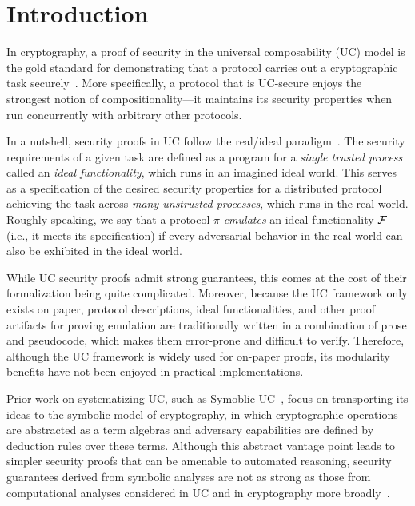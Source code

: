 \section{Introduction}
\label{sec:introduction}

In cryptography, a proof of security in the universal composability (UC) model
is the gold standard for demonstrating that a protocol carries out a
cryptographic task securely~\cite{canetti2001universally}. More specifically, a
protocol that is UC-secure enjoys the strongest notion of compositionality---it
maintains its security properties when run concurrently with arbitrary other
protocols.

In a nutshell, security proofs in UC follow the real/ideal
paradigm~\cite{goldreich1987play}. The security requirements of a given task are
defined as a program for a \emph{single trusted process} called an \emph{ideal
  functionality}, which runs in an imagined ideal world. This serves as a
specification of the desired security properties for a distributed protocol
achieving the task across \emph{many unstrusted processes}, which runs in the
real world. Roughly speaking, we say that a protocol $\pi$ \emph{emulates} an
ideal functionality $\mathcal{{F}}$ (i.e., it meets its specification) if every
adversarial behavior in the real world can also be exhibited in the ideal world.

While UC security proofs admit strong guarantees, this comes at the cost of
their formalization being quite complicated. Moreover, because the UC framework
only exists on paper, protocol descriptions, ideal functionalities, and other
proof artifacts for proving emulation are traditionally written in a combination
of prose and pseudocode, which makes them error-prone and difficult to
verify. Therefore, although the UC framework is widely used for on-paper proofs,
its modularity benefits have not been enjoyed in practical implementations.

Prior work on systematizing UC, such as Symoblic UC~\cite{bohl2016symbolic},
focus on transporting its ideas to the symbolic model of cryptography, in which
cryptographic operations are abstracted as a term algebras and adversary
capabilities are defined by deduction rules over these terms. Although this
abstract vantage point leads to simpler security proofs that can be amenable to
automated reasoning, security guarantees derived from symbolic analyses are not
as strong as those from computational analyses considered in UC and in
cryptography more broadly~\cite{cortier2011survey}.

